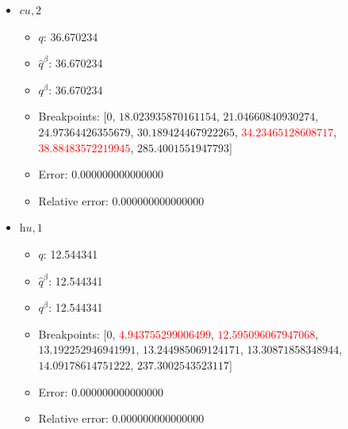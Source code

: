 \documentclass{article}%
\begin{document}
\begin{itemize}
	\begin{itemize}%
		\item $q$: 4.432281%
		\item $\hat{q}^\beta$: 4.432281%
		\item $q^\beta$: 4.432281%
		\item Breakpoints: $[$$0$, \textcolor{red}{$2.9819181007907165$}, \textcolor{red}{$7.702824927089129$}, $9.28003023700696$, $13.56934656224007$, $14.535545040173215$, $181.61828057849593$$]$%
		\item Error: 0.000000000000000%
		\item Relative error: 0.000000000000000%
	\end{itemize}%
	\item $\textit{cu},2$%
	\begin{itemize}%
		\item $q$: 36.670234%
		\item $\hat{q}^\beta$: 36.670234%
		\item $q^\beta$: 36.670234%
		\item Breakpoints: $[$$0$, $18.023935870161154$, $21.04660840930274$, $24.97364426355679$, $30.189424467922265$, \textcolor{red}{$34.23465128608717$}, \textcolor{red}{$38.88483572219945$}, $285.4001551947793$$]$%
		\item Error: 0.000000000000000%
		\item Relative error: 0.000000000000000%
	\end{itemize}%
	\item $\textit{hu},1$%
	\begin{itemize}%
		\item $q$: 12.544341%
		\item $\hat{q}^\beta$: 12.544341%
		\item $q^\beta$: 12.544341%
		\item Breakpoints: $[$$0$, \textcolor{red}{$4.943755299006499$}, \textcolor{red}{$12.595096067947068$}, $13.192252946941991$, $13.244985069124171$, $13.30871858348944$, $14.09178614751222$, $237.3002543523117$$]$%
		\item Error: 0.000000000000000%
		\item Relative error: 0.000000000000000%
	\end{itemize}%
\end{itemize}%
\end{document}
